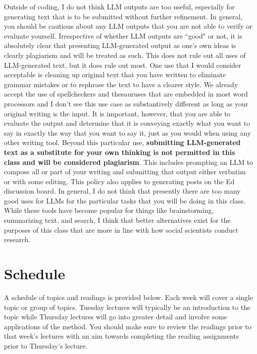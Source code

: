 \documentclass[11pt, article, oneside]{memoir}
\theoremstyle{Assumption}
\begin{document}
\newline\newline
Outside of coding, I do not think LLM outputs are too useful, especially for generating text that is to be submitted without further refinement. In general, you should be cautious about any LLM outputs that you are not able to verify or evaluate yourself. 
\newline\newline
Irrespective of whether LLM outputs are ``good" or not, it is absolutely clear that presenting LLM-generated output as one's own ideas is clearly plagiarism and will be treated as such. This does not rule out all uses of LLM-generated text, but it does rule out most. One use that I would consider acceptable is cleaning up original text that you have written to eliminate grammar mistakes or to rephrase the text to have a clearer style. We already accept the use of spellcheckers and thesauruses that are embedded in most word processors and I don't see this use case as substantively different as long as your original writing is the input. It is important, however, that you are able to evaluate the output and determine that it is conveying exactly what you want to say in exactly the way that you want to say it, just as you would when using any other writing tool.
\newline\newline
Beyond this particular use, \textbf{submitting LLM-generated text as a substitute for your own thinking is not permitted in this class and will be considered plagiarism}. This includes prompting an LLM to compose all or part of your writing and submitting that output either verbatim or with some editing. This policy also applies to generating posts on the Ed discussion board. 
\newline\newline
In general, I do not think that presently there are too many good uses for LLMs for the particular tasks that you will be doing in this class. While these tools have become popular for things like brainstorming, summarizing text, and search, I think that better alternatives exist for the purposes of this class that are more in line with how social scientists conduct research. 

\section*{Schedule}

A schedule of topics and readings is provided below. Each week will cover a single topic or group of topics. Tuesday lectures will typically be an introduction to the topic while Thursday lectures will go into greater detail and involve some applications of the method. You should make sure to review the readings prior to that week's lectures with an aim towards completing the reading assignments prior to Thursday's lecture.
\end{document}
